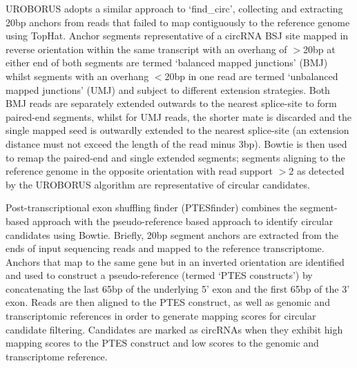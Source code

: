 \documentclass[journal,review,submit,pdftex,moreauthors]{Definitions/mdpi}
\begin{document}
UROBORUS \cite{UROBORUS} adopts a similar approach to `find\_circ', collecting and extracting 20bp anchors from reads that failed to map contiguously to the reference genome using TopHat. Anchor segments representative of a circRNA BSJ site mapped in reverse orientation within the same transcript with an overhang of $>$20bp at either end of both segments are termed `balanced mapped junctions' (BMJ) whilst segments with an overhang $<$20bp in one read are termed `unbalanced mapped junctions' (UMJ) and subject to different extension strategies. Both BMJ reads are separately extended outwards to the nearest splice-site to form paired-end segments, whilst for UMJ reads, the shorter mate is discarded and the single mapped seed is outwardly extended to the nearest splice-site (an extension distance must not exceed the length of the read minus 3bp). Bowtie is then used to remap the paired-end and single extended segments; segments aligning to the reference genome in the opposite orientation with read support $>$2 as detected by the UROBORUS algorithm are representative of circular candidates. \par
Post-transcriptional exon shuffling finder (PTESfinder) \cite{PTESfinder} combines the segment-based approach with the pseudo-reference based approach to identify circular candidates using Bowtie. Briefly, 20bp segment anchors are extracted from the ends of input sequencing reads and mapped to the reference transcriptome. Anchors that map to the same gene but in an inverted orientation are identified and used to construct a pseudo-reference (termed `PTES constructs') by concatenating the last 65bp of the underlying 5' exon and the first 65bp of the 3' exon. Reads are then aligned to the PTES construct, as well as genomic and transcriptomic references in order to generate mapping scores for circular candidate filtering. Candidates are marked as circRNAs when they exhibit high mapping scores to the PTES construct and low scores to the genomic and transcriptome reference. \par 
\end{document}
